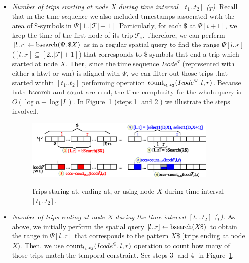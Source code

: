 	\begin{itemize}
	
		\item {\em Number of trips starting at node $X$ during time interval $[t_1..t_2]$ (\startX$_T$).}
		Recall that in the time sequence we also included timestamps associated with the area of $\$$-symbols in $\Psi[1..|\mathcal{T}|+1]$.
		Particularly, for each $\$$ at $\Psi[i+1]$, we keep the time of the first node of its trip $\mathcal{T}_i$. Therefore, 
		we can perform $[l..r]\leftarrow\operatorname{bsearch}(\Psi,\$X)$ as in a regular spatial query to find the
		range $\Psi[l..r]$ ($[l..r]\subseteq [2..|\mathcal{T}|+1]$) that corresponds to $\$$ symbols that end a trip which started at node $X$. Then, since the time sequence $Icode^{\Psi}$ 
		(represented with either a \gls{htwt} or \gls{wm}) is
		 aligned with $\Psi$, we can filter out those trips that started within $[t_1..t_2]$ performing operation $\operatorname{count}_{t_1,t_2}(Icode^{\Psi},l,r)$. Because both $\operatorname{bsearch}$ and $\operatorname{count}$ are used, the time complexity for the whole query is $O(\log n + \log|I|)$. In Figure~\ref{fig:ctr:search2} (steps \textcircled{1} and \textcircled{2}) we illustrate the steps involved.

	\begin{figure}[th]
		\begin{center}
			{\includegraphics[width=0.90\textwidth]{figures/search2.eps}}
		\end{center}
		\caption{Trips staring at, ending at, or using node $X$  during time interval $[t_1..t_2]$.}
		\label{fig:ctr:search2}
	\end{figure}
		
		\item {\em Number of trips ending at node $X$ during the time interval $[t_1..t_2]$ (\endX$_T$). }
		As above, we initially perform the spatial query $[l..r]\leftarrow\operatorname{bsearch}(X\$)$ to 
		obtain the range in $\Psi[l..r]$ that corresponds to the pattern $X\$$ (trips ending at node $X$). Then, we use  $\operatorname{count}_{t_1,t_2}(Icode^{\Psi},l,r)$ operation to count how many of those trips match the temporal constraint. See steps \textcircled{3} and \textcircled{4} in Figure~\ref{fig:ctr:search2}.
		

\end{itemize}
